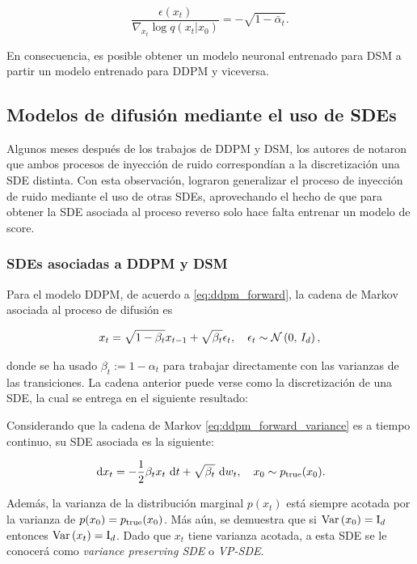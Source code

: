 \begin{equation*}
    \frac{\epsilon(x_t)}{\nabla_{x_t}\log q(x_t|x_0)} = -\sqrt{1-\bar\alpha_t}.
\end{equation*}

En consecuencia, es posible obtener un modelo neuronal entrenado para DSM a partir un modelo entrenado para DDPM y viceversa.

\subsection{Modelos de difusión mediante el uso de SDEs}
\label{dm/continuous_dm/sde_dm}

Algunos meses después de los trabajos de DDPM y DSM, los autores de \cite{song2021scorebased} notaron que ambos procesos de inyección de ruido correspondían a la discretización una SDE distinta. Con esta observación, lograron generalizar el proceso de inyección de ruido mediante el uso de otras SDEs, aprovechando el hecho de que para obtener la SDE asociada al proceso reverso solo hace falta entrenar un modelo de score.

\subsubsection{SDEs asociadas a DDPM y DSM}

Para el modelo DDPM, de acuerdo a \eqref{eq:ddpm_forward}, la cadena de Markov asociada al proceso de difusión es

\begin{equation}
    \label{eq:ddpm_forward_variance}
    x_t = \sqrt{1-\beta_t} x_{t-1} + \sqrt{\beta_t} \epsilon_t,\quad \epsilon_t\sim\mathcal{N}\left(0,\,I_d\right),
\end{equation}

donde se ha usado $\beta_t:=1-\alpha_t$ para trabajar directamente con las varianzas de las transiciones. La cadena anterior puede verse como la discretización de una SDE, la cual se entrega en el siguiente resultado:

\begin{prop}
    Considerando que la cadena de Markov \eqref{eq:ddpm_forward_variance} es a tiempo continuo, su SDE asociada es la siguiente:

    \begin{equation}
        \label{eq:ddpm_sde}
        \,\operatorname{d}\! x_t = -\frac{1}{2}\beta_t x_t \,\operatorname{d}\! t + \sqrt{\beta_t}\,\operatorname{d}\! w_t, \quad x_0\sim p_{\operatorname{true}}(x_0).
    \end{equation}

    Además, la varianza de la distribución marginal $p(x_t)$ está siempre acotada por la varianza de $p(x_0)=p_{\operatorname{true}}(x_0)$. Más aún, se demuestra que si $\operatorname{Var}\left(x_0\right)=\operatorname{I}_{d}$ entonces $\operatorname{Var}\left(x_t\right)=\operatorname{I}_{d}$. Dado que $x_t$ tiene varianza acotada, a esta SDE se le conocerá como \textit{variance preserving SDE} o \textit{VP-SDE}.
\end{prop}

